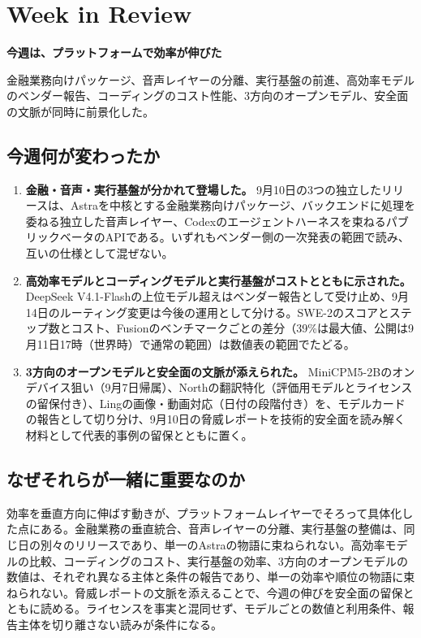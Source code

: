\section{Week in Review}
\begin{wideflow}
{\Large\bfseries 今週は、プラットフォームで効率が伸びた}\par
\smallskip
{\color{SurveyMuted}金融業務向けパッケージ、音声レイヤーの分離、実行基盤の前進、高効率モデルのベンダー報告、コーディングのコスト性能、3方向のオープンモデル、安全面の文脈が同時に前景化した。}\par
\end{wideflow}

\subsection*{今週何が変わったか}
\begin{enumerate}[leftmargin=1.6em]
\item \textbf{金融・音声・実行基盤が分かれて登場した。} 9月10日の3つの独立したリリースは、Astraを中核とする金融業務向けパッケージ、バックエンドに処理を委ねる独立した音声レイヤー、Codexのエージェントハーネスを束ねるパブリックベータのAPIである。いずれもベンダー側の一次発表の範囲で読み、互いの仕様として混ぜない。
\item \textbf{高効率モデルとコーディングモデルと実行基盤がコストとともに示された。} DeepSeek V4.1-Flashの上位モデル超えはベンダー報告として受け止め、9月14日のルーティング変更は今後の運用として分ける。SWE-2のスコアとステップ数とコスト、Fusionのベンチマークごとの差分（39\%は最大値、公開は9月11日17時（世界時）で通常の範囲）は数値表の範囲でたどる。
\item \textbf{3方向のオープンモデルと安全面の文脈が添えられた。} MiniCPM5-2Bのオンデバイス狙い（9月7日帰属）、Northの翻訳特化（評価用モデルとライセンスの留保付き）、Lingの画像・動画対応（日付の段階付き）を、モデルカードの報告として切り分け、9月10日の脅威レポートを技術的安全面を読み解く材料として代表的事例の留保とともに置く。
\end{enumerate}

\subsection*{なぜそれらが一緒に重要なのか}
効率を垂直方向に伸ばす動きが、プラットフォームレイヤーでそろって具体化した点にある。金融業務の垂直統合、音声レイヤーの分離、実行基盤の整備は、同じ日の別々のリリースであり、単一のAstraの物語に束ねられない。高効率モデルの比較、コーディングのコスト、実行基盤の効率、3方向のオープンモデルの数値は、それぞれ異なる主体と条件の報告であり、単一の効率や順位の物語に束ねられない。脅威レポートの文脈を添えることで、今週の伸びを安全面の留保とともに読める。ライセンスを事実と混同せず、モデルごとの数値と利用条件、報告主体を切り離さない読みが条件になる。

